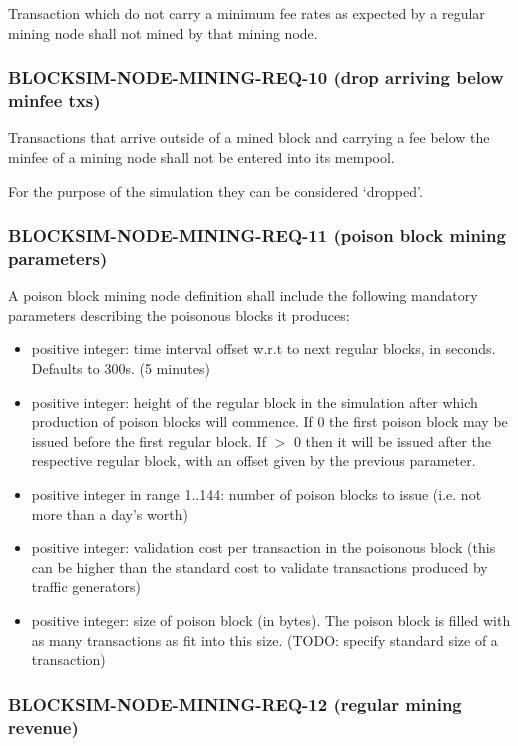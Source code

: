 \documentclass{scrreprt}
\begin{document}
Transaction which do not carry a minimum fee rates as expected by a regular mining
node shall not mined by that mining node.


\subsubsection{BLOCKSIM-NODE-MINING-REQ-10 (drop arriving below minfee txs)}

Transactions that arrive outside of a mined block and carrying a fee below
the minfee of a mining node shall not be entered into its mempool.

For the purpose of the simulation they can be considered `dropped'.

\subsubsection{BLOCKSIM-NODE-MINING-REQ-11 (poison block mining parameters)}

A poison block mining node definition shall include the following mandatory
parameters describing the poisonous blocks it produces:

\begin{itemize}
   \item positive integer: time interval offset w.r.t to next regular blocks, in seconds. Defaults to 300s. (5 minutes)
   \item positive integer: height of the regular block in the simulation after which production of poison blocks will commence. If 0 the first poison block may be issued before the first regular block. If $>$ 0 then it will be issued after the respective regular block, with an offset given by the previous parameter.
   \item positive integer in range 1..144: number of poison blocks to issue (i.e. not more than a day's worth)
   \item positive integer: validation cost per transaction in the poisonous block (this can be higher than the standard cost to validate transactions produced by traffic generators)
   \item positive integer: size of poison block (in bytes). The poison block is filled with as many transactions as fit into this size. (TODO: specify standard size of a transaction)
\end{itemize}

\subsubsection{BLOCKSIM-NODE-MINING-REQ-12 (regular mining revenue)}
\end{document}
